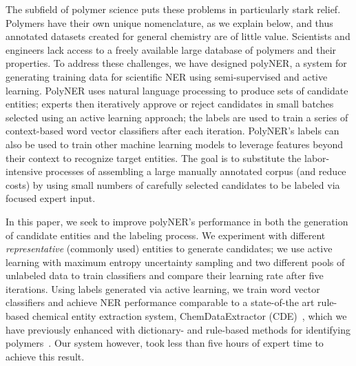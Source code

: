 The subfield of polymer science puts these problems in particularly stark relief.
Polymers have their own unique nomenclature, as we explain below, and thus annotated datasets created for general
chemistry are of little value.
Scientists and engineers lack access to a freely available large database of polymers and their properties.
To address these challenges, we have designed polyNER, a system for generating training data for scientific NER using semi-supervised and active learning.
PolyNER uses natural language processing to produce sets of candidate entities;
experts then iteratively approve or reject candidates in small batches selected using an active learning
 approach;
the labels are used to train a series of context-based word vector classifiers after each iteration.
PolyNER's labels can also be used to train other machine learning models to leverage features beyond their context to recognize target entities.
The goal is
to substitute the labor-intensive processes of assembling a large
manually annotated corpus (and reduce costs) by using small numbers of carefully selected candidates to be labeled via focused expert input. 

In this paper, we seek to improve polyNER's performance in both the generation of candidate entities and the labeling process.
We experiment with different \textit{representative} (commonly used) entities to generate candidates;
we use active learning with maximum entropy uncertainty sampling and two different pools of unlabeled data to train classifiers and compare their learning rate after five iterations. 
Using labels generated via active learning, we train word vector classifiers and achieve NER performance comparable to 
a state-of-the art rule-based chemical entity extraction
system, ChemDataExtractor (CDE)~\cite{swain2016chemdataextractor}, which we have previously enhanced
with dictionary- and rule-based methods for identifying polymers~\cite{tchoua2017towards}.
Our system however, took less than five hours of expert time to achieve this result.


